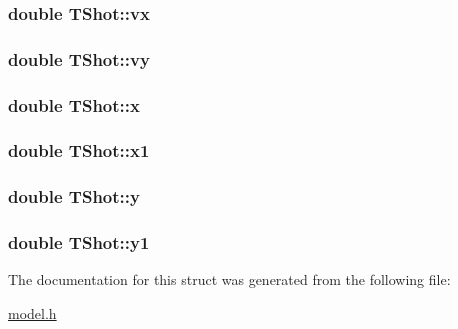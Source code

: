 \subsubsection[{\texorpdfstring{vx}{vx}}]{\setlength{\rightskip}{0pt plus 5cm}double T\+Shot\+::vx}\hypertarget{struct_t_shot_add4d9845cee9082a489e2aae73a20891}{}\label{struct_t_shot_add4d9845cee9082a489e2aae73a20891}
\subsubsection[{\texorpdfstring{vy}{vy}}]{\setlength{\rightskip}{0pt plus 5cm}double T\+Shot\+::vy}\hypertarget{struct_t_shot_a3ad1d2834c4be13bcdf488ef57de8311}{}\label{struct_t_shot_a3ad1d2834c4be13bcdf488ef57de8311}
\subsubsection[{\texorpdfstring{x}{x}}]{\setlength{\rightskip}{0pt plus 5cm}double T\+Shot\+::x}\hypertarget{struct_t_shot_a20e267b4a3e1f0feca9ff50c6c8dd460}{}\label{struct_t_shot_a20e267b4a3e1f0feca9ff50c6c8dd460}
\subsubsection[{\texorpdfstring{x1}{x1}}]{\setlength{\rightskip}{0pt plus 5cm}double T\+Shot\+::x1}\hypertarget{struct_t_shot_a04c0ba5caa1ea9ab2be4f282d44423bb}{}\label{struct_t_shot_a04c0ba5caa1ea9ab2be4f282d44423bb}
\subsubsection[{\texorpdfstring{y}{y}}]{\setlength{\rightskip}{0pt plus 5cm}double T\+Shot\+::y}\hypertarget{struct_t_shot_a04381372a3ffa1796de43381ab1409f6}{}\label{struct_t_shot_a04381372a3ffa1796de43381ab1409f6}
\subsubsection[{\texorpdfstring{y1}{y1}}]{\setlength{\rightskip}{0pt plus 5cm}double T\+Shot\+::y1}\hypertarget{struct_t_shot_ad00c30f4c3b310313614c3f9690ff3af}{}\label{struct_t_shot_ad00c30f4c3b310313614c3f9690ff3af}


The documentation for this struct was generated from the following file\+:\begin{DoxyCompactItemize}
\item 
\hyperlink{model_8h}{model.\+h}\end{DoxyCompactItemize}
